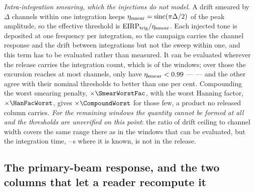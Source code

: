 \emph{Intra-integration smearing, which the injections do not model.} A drift
smeared by $\Delta$ channels within one integration keeps
$\eta_{\rm smear}=\mathrm{sinc}(\pi\Delta/2)$ of the peak amplitude, so the
effective threshold is $\mathrm{EIRP}_{\rm trig}/\eta_{\rm smear}$. Each
injected tone is deposited at one frequency per integration, so the campaign
carries the channel response and the drift between integrations but not the
sweep within one, and this term has to be evaluated rather than measured. It
can be evaluated wherever the release carries the integration count, which is
\CsNDumpWin{} of the \NWindows{} windows; over those the excursion reaches at
most \SmearDeltaMax{} channels, only \NSmearLo{} have
$\eta_{\rm smear}<0.99$ --- \SmearList{} --- and the other \NSmearOk{} agree
with their nominal thresholds to better than one per cent. Compounding the
worst smearing penalty, $\times\SmearWorstFac$, with the worst Hanning
factor, $\times\HanFacWorst$, gives $\times\CompoundWorst$ for those few, a
product no released column carries. \emph{For the remaining
\BkSmearNUnver{} windows the quantity cannot be formed at all and the
thresholds are unverified on this point}: the ratio of drift ceiling to
channel width covers the same range there as in the windows that can be
evaluated, but the integration time, \BkSmearIntLo--\BkSmearIntHi\,s where it
is known, is not in the release.

\subsection{The primary-beam response, and the two columns that let a reader
recompute it}

